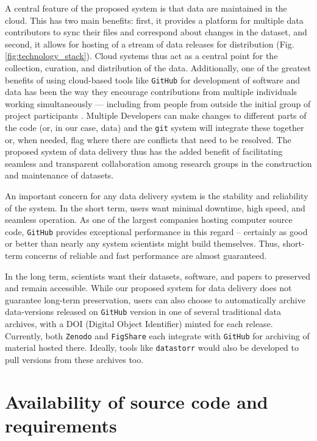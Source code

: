 \documentclass[a4paper,num-refs]{assets/oup-contemporary}
\begin{document}
A central feature of the proposed system is that data are maintained in the cloud. This has two main benefits: first, it provides a platform for multiple data contributors to sync their files and correspond about changes in the dataset, and second, it allows for hosting of a stream of data releases for distribution (Fig. \ref{fig:technology_stack}). Cloud systems thus act as a central point for the collection, curation, and distribution of the data. Additionally, one of the greatest benefits of using cloud-based tools like  \texttt{GitHub} for development of software and data has been the way they encourage contributions from multiple individuals working simultaneously --- including from people from outside the initial group of project participants \cite{Rogers-2013, Perkel-2016}. Multiple Developers can make changes to different parts of the code (or, in our case, data) and the \texttt{git} system will integrate these together or, when needed, flag where there are conflicts that need to be resolved. The proposed system of data delivery thus has the added benefit of facilitating seamless and transparent collaboration among research groups in the construction and maintenance of datasets.

An important concern for any data delivery system is the stability and reliability of the system. In the short term, users want minimal downtime, high speed, and seamless operation. As one of the largest companies hosting computer source code, \texttt{GitHub} provides exceptional performance in this regard -- certainly as good or better than nearly any system scientists might build themselves. Thus, short-term concerns of reliable and fast performance are almost guaranteed.

In the long term, scientists want their datasets, software, and papers to preserved and remain accessible. While our proposed system for data delivery does not guarantee long-term preservation, users can also choose to automatically archive data-versions released on \texttt{GitHub} version in one of several traditional data archives, with a DOI (Digital Object Identifier) minted for each release. Currently, both \texttt{Zenodo} and  \texttt{FigShare} each integrate with \texttt{GitHub} for archiving of material hosted there. Ideally, tools like \texttt{datastorr} would also be developed to pull versions from these archives too. 

\section{Availability of source code and requirements}
\end{document}
